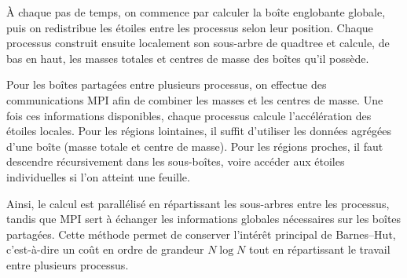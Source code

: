 \documentclass[11pt,a4paper]{article}
\begin{document}
À chaque pas de temps, on commence par calculer la boîte englobante globale, puis on redistribue les étoiles entre les processus selon leur position. Chaque processus construit ensuite localement son sous-arbre de quadtree et calcule, de bas en haut, les masses totales et centres de masse des boîtes qu'il possède.

Pour les boîtes partagées entre plusieurs processus, on effectue des communications MPI afin de combiner les masses et les centres de masse. Une fois ces informations disponibles, chaque processus calcule l'accélération des étoiles locales. Pour les régions lointaines, il suffit d'utiliser les données agrégées d'une boîte (masse totale et centre de masse). Pour les régions proches, il faut descendre récursivement dans les sous-boîtes, voire accéder aux étoiles individuelles si l'on atteint une feuille.

Ainsi, le calcul est parallélisé en répartissant les sous-arbres entre les processus, tandis que MPI sert à échanger les informations globales nécessaires sur les boîtes partagées. Cette méthode permet de conserver l'intérêt principal de Barnes--Hut, c'est-à-dire un coût en ordre de grandeur $N \log N$ tout en répartissant le travail entre plusieurs processus.
\end{document}
